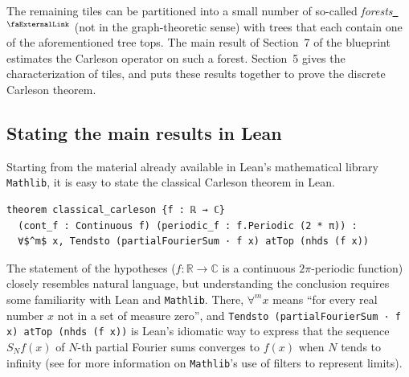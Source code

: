 \documentclass[12pt, reqno]{amsart}
\newcounter{lstlisting}[section]
\let\lean\lstinline
\newcommand*{\complex}{\mathbb{C}} %
\newcommand*{\real}{\mathbb{R}} %
\newcommand{\mathlib}{\texttt{Mathlib}\xspace}
\newcommand{\extlink}{~\ensuremath{{}^\text{\faExternalLink}}}
\theoremstyle{definition}
\theoremstyle{plain}
\begin{document}
The remaining tiles can be partitioned into a small number of so-called \emph{forests}\href{https://github.com/fpvandoorn/carleson/blob/AFM-frozen/Carleson/Forest.lean#L21-L33}{\extlink}
(not in the graph-theoretic sense)
with trees that each contain one of the aforementioned tree tops.
The main result of Section~7 of the blueprint estimates the Carleson operator on such a forest.
Section~5 gives the characterization of tiles,
and puts these results together to prove the discrete Carleson theorem.

\subsection{Stating the main results in Lean}\label{subsec:lean-statements}

Starting from the material already available in Lean's mathematical library \mathlib, it is easy to state the classical Carleson theorem in Lean.
\begin{lstlisting}[mathescape]
theorem classical_carleson {f : ℝ → ℂ}
  (cont_f : Continuous f) (periodic_f : f.Periodic (2 * π)) :
  ∀$^m$ x, Tendsto (partialFourierSum · f x) atTop (nhds (f x))
\end{lstlisting}

The statement of the hypotheses ($f \colon \real \to \complex$ is a continuous $2\pi$-periodic function) closely resembles natural language, but understanding the conclusion requires some familiarity with Lean and \mathlib. There, $\forall^m x$ means ``for every real number $x$ not in a set of measure zero'', and
\lean{Tendsto (partialFourierSum · f x) atTop (nhds (f x))} is Lean's idiomatic way to express that the sequence $S_N f(x)$ of $N$-th partial Fourier sums converges to $f(x)$ when $N$ tends to infinity (see \cite[\S11.1]{mathematics_in_lean} for more information on \mathlib's use of filters to represent limits).
\end{document}

